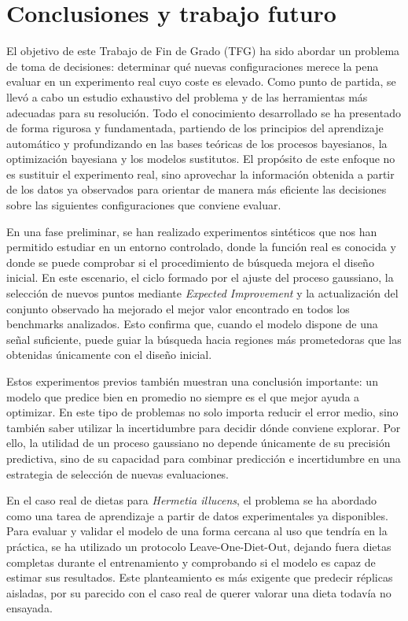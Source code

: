 \chapter{Conclusiones y trabajo futuro}
\label{chap:conclusiones_trabajo_futuro}

El objetivo de este Trabajo de Fin de Grado (TFG) ha sido abordar un problema de toma de decisiones: determinar qué nuevas configuraciones merece la pena evaluar en un experimento real cuyo coste es elevado.
Como punto de partida, se llevó a cabo un estudio exhaustivo del problema y de las herramientas más adecuadas para su resolución.
Todo el conocimiento desarrollado se ha presentado de forma rigurosa y fundamentada, partiendo de los principios del aprendizaje automático y profundizando en las bases teóricas de los procesos bayesianos, la optimización bayesiana y los modelos sustitutos.
El propósito de este enfoque no es sustituir el experimento real, sino aprovechar la información obtenida a partir de los datos ya observados para orientar de manera más eficiente las decisiones sobre las siguientes configuraciones que conviene evaluar.

En una fase preliminar, se han realizado experimentos sintéticos  que nos han permitido estudiar en un entorno controlado, donde la función real es conocida y donde se puede comprobar si el procedimiento de búsqueda mejora el diseño inicial.
En este escenario, el ciclo formado por el ajuste del proceso gaussiano, la selección de nuevos puntos mediante \textit{Expected Improvement} y la actualización del conjunto observado ha mejorado el mejor valor encontrado en todos los benchmarks analizados.
Esto confirma que, cuando el modelo dispone de una señal suficiente, puede guiar la búsqueda hacia regiones más prometedoras que las obtenidas únicamente con el diseño inicial.

Estos experimentos previos también muestran una conclusión importante:
un modelo que predice bien en promedio no siempre es el que mejor ayuda a optimizar.
En este tipo de problemas no solo importa reducir el error medio, sino también saber utilizar la incertidumbre para decidir dónde conviene explorar.
Por ello, la utilidad de un proceso gaussiano no depende únicamente de su precisión predictiva, sino de su capacidad para combinar predicción e incertidumbre en una estrategia de selección de nuevas evaluaciones.

En el caso real de dietas para \textit{Hermetia illucens}, el problema se ha abordado como una tarea de aprendizaje a partir de datos experimentales ya disponibles.
Para evaluar y validar el modelo de una forma cercana al uso que tendría en la práctica, se ha utilizado un protocolo Leave-One-Diet-Out, dejando fuera dietas completas durante el entrenamiento y comprobando si el modelo es capaz de estimar sus resultados.
Este planteamiento es más exigente que predecir réplicas aisladas, por su parecido con el caso real de querer valorar una dieta todavía no ensayada.

